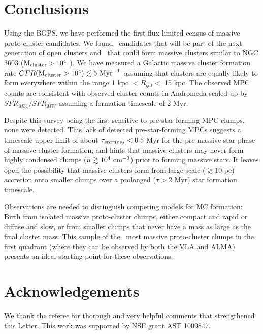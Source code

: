 \section{Conclusions}
\label{sec:ympcconclusions}

Using the BGPS, we have performed the first flux-limited census of massive
proto-cluster candidates.  We found \ncandidates\ candidates that will be part
of the next generation of open clusters and \nMPC\ that could form massive
clusters similar to NGC 3603 (${\rm M}_{\rm cluster} > 10^4$ \msun).   We have
measured a Galactic massive cluster formation rate $CFR({\rm M}_{\rm
cluster}>10^4) \lesssim 5\  \mathrm{Myr}^{-1}$\ assuming that clusters are equally
likely to form everywhere within the range 1 kpc $ < R_{gal} < $ 15   kpc. 
The observed MPC counts are
consistent with observed cluster counts in Andromeda scaled up by $SFR_{M31} /
SFR_{MW}$ assuming a formation timescale of 2 Myr.  

Despite this survey being the first sensitive to pre-star-forming MPC clumps, none
were detected.  This lack of detected pre-star-forming MPCs suggests a
timescale upper limit of about $\tau_{starless}<0.5$ Myr for the pre-massive-star phase of
massive cluster formation, and hints that massive clusters may never form
highly condensed clumps ($\bar{n}\gtrsim10^4~\textrm{cm}^{-3}$) prior to forming massive
stars.
It leaves open the possibility that massive clusters form from large-scale
($\gtrsim 10$ pc) accretion onto smaller clumps over a prolonged ($\tau > 2$
Myr) star formation timescale.


Observations are needed to distinguish competing models for MC formation:
Birth from isolated massive proto-cluster clumps, either compact and rapid
or diffuse and slow, or from smaller clumps that
never have a mass as large as the final cluster
mass.  
This sample of the \ncandidates\ most massive proto-cluster clumps in the first
quadrant (where they can be observed by both the VLA and ALMA) presents an ideal
starting point for these observations.

\section{Acknowledgements}
We thank the referee for thorough and very helpful comments that strengthened
this Letter.  This work was supported by NSF grant AST 1009847.


%






